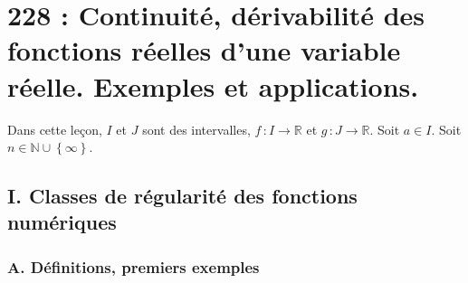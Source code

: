 \documentclass[10pt, a4paper, parskip=full, twoside, twocolumn]{report}
\newcommand{\IN}{\mathbb{N}}
\newcommand{\IR}{\mathbb{R}}
\begin{document}
\chapter*{228 : Continuité, dérivabilité des fonctions réelles d’une variable réelle. Exemples et applications.}
\setcounter{definition}{0}

\textcolor{paragraphtext}{Dans cette leçon, $I$ et $J$ sont des intervalles, $f\,\colon I\to \IR$ et $g\,\colon J\to\IR$. 
Soit $a\in I$. Soit $n\in \IN\cup\left\{\infty\right\}$.}

\section*{I. Classes de régularité des fonctions numériques}
\subsection*{A. Définitions, premiers exemples}
\end{document}
